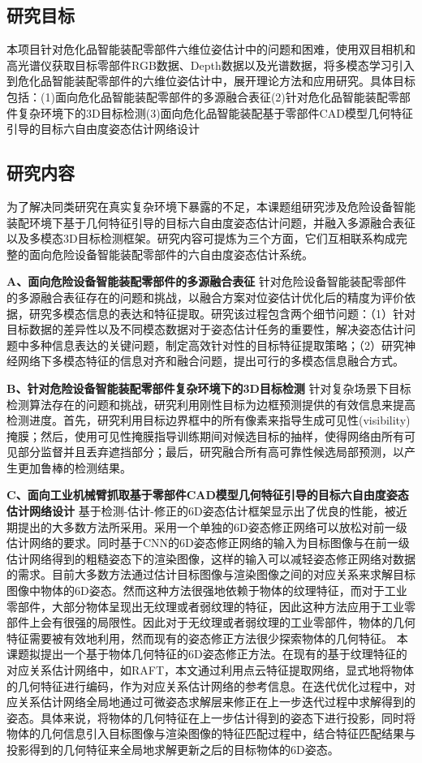 \documentclass[12pt]{article}
\begin{document}
\subsection{研究目标}
本项目针对危化品智能装配零部件六维位姿估计中的问题和困难，使用双目相机和高光谱仪获取目标零部件RGB数据、Depth数据以及光谱数据，将多模态学习引入到危化品智能装配零部件的六维位姿估计中，展开理论方法和应用研究。具体目标包括：(1)面向危化品智能装配零部件的多源融合表征(2)针对危化品智能装配零部件复杂环境下的3D目标检测(3)面向危化品智能装配基于零部件CAD模型几何特征引导的目标六自由度姿态估计网络设计



\subsection{研究内容}

为了解决同类研究在真实复杂环境下暴露的不足，本课题组研究涉及危险设备智能装配环境下基于几何特征引导的目标六自由度姿态估计问题，并融入多源融合表征以及多模态3D目标检测框架。研究内容可提炼为三个方面，它们互相联系构成完整的面向危险设备智能装配零部件的六自由度姿态估计系统。

\textbf{A、面向危险设备智能装配零部件的多源融合表征}
针对危险设备智能装配零部件的多源融合表征存在的问题和挑战，以融合方案对位姿估计优化后的精度为评价依据，研究多模态信息的表达和特征提取。研究该过程包含两个细节问题：（1）针对目标数据的差异性以及不同模态数据对于姿态估计任务的重要性，解决姿态估计问题中多种信息表达的关键问题，制定高效针对性的目标特征提取策略；（2）研究神经网络下多模态特征的信息对齐和融合问题，提出可行的多模态信息融合方式。

\textbf{B、针对危险设备智能装配零部件复杂环境下的3D目标检测}
针对复杂场景下目标检测算法存在的问题和挑战，研究利用刚性目标为边框预测提供的有效信息来提高检测进度。首先，研究利用目标边界框中的所有像素来指导生成可见性(visibility)掩膜；然后，使用可见性掩膜指导训练期间对候选目标的抽样，使得网络由所有可见部分监督并且丢弃遮挡部分；最后，研究融合所有高可靠性候选局部预测，以产生更加鲁棒的检测结果。

\textbf{C、面向工业机械臂抓取基于零部件CAD模型几何特征引导的目标六自由度姿态估计网络设计}
基于检测-估计-修正的6D姿态估计框架显示出了优良的性能，被近期提出的大多数方法所采用。采用一个单独的6D姿态修正网络可以放松对前一级估计网络的要求。同时基于CNN的6D姿态修正网络的输入为目标图像与在前一级估计网络得到的粗糙姿态下的渲染图像，这样的输入可以减轻姿态修正网络对数据的需求。目前大多数方法通过估计目标图像与渲染图像之间的对应关系来求解目标图像中物体的6D姿态。然而这种方法很强地依赖于物体的纹理特征，而对于工业零部件，大部分物体呈现出无纹理或者弱纹理的特征，因此这种方法应用于工业零部件上会有很强的局限性。因此对于无纹理或者弱纹理的工业零部件，物体的几何特征需要被有效地利用，然而现有的姿态修正方法很少探索物体的几何特征。
本课题拟提出一个基于物体几何特征的6D姿态修正方法。在现有的基于纹理特征的对应关系估计网络中，如RAFT，本文通过利用点云特征提取网络，显式地将物体的几何特征进行编码，作为对应关系估计网络的参考信息。在迭代优化过程中，对应关系估计网络全局地通过可微姿态求解层来修正在上一步迭代过程中求解得到的姿态。具体来说，将物体的几何特征在上一步估计得到的姿态下进行投影，同时将物体的几何信息引入目标图像与渲染图像的特征匹配过程中，结合特征匹配结果与投影得到的几何特征来全局地求解更新之后的目标物体的6D姿态。
\end{document}
